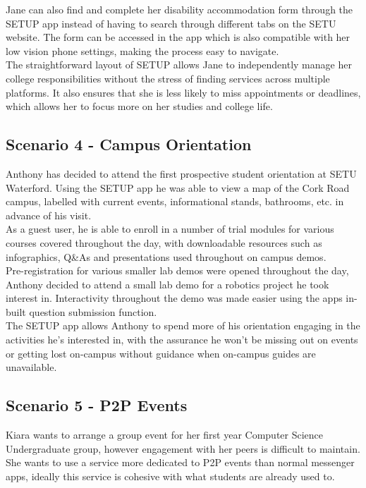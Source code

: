 Jane can also find and complete her disability accommodation form through the SETUP app instead of having to search through different tabs on the SETU website. The form can be accessed in the app which is also compatible with her low vision phone settings, making the process easy to navigate.\\

The straightforward layout of SETUP  allows Jane to independently manage her college responsibilities without the stress of finding services across multiple platforms. It also ensures that she is less likely to miss appointments or deadlines, which allows her to focus more on her studies and college life.

\subsection*{Scenario 4 - Campus Orientation}
Anthony has decided to attend the first prospective student orientation at SETU Waterford. Using the SETUP app he was able to view a map of the Cork Road campus, labelled with current events, informational stands, bathrooms, etc. in advance of his visit. \\

As a guest user, he is able to enroll in a number of trial modules for various courses covered throughout the day, with downloadable resources such as infographics, Q\&As and presentations used throughout on campus demos.\\

Pre-registration for various smaller lab demos were opened throughout the day, Anthony decided to attend a small lab demo for a robotics project he took interest in. Interactivity throughout the demo was made easier using the apps in-built question submission function.\\

The SETUP app allows Anthony to spend more of his orientation engaging in the activities he's interested in, with the assurance he won't be missing out on events or getting lost on-campus without guidance when on-campus guides are unavailable. 

\subsection*{Scenario 5 - P2P Events}
Kiara wants to arrange a group event for her first year Computer Science Undergraduate group, however engagement with her peers is difficult to maintain. She wants to use a service more dedicated to P2P events than normal messenger apps, ideally this service is cohesive with what students are already used to. \\

